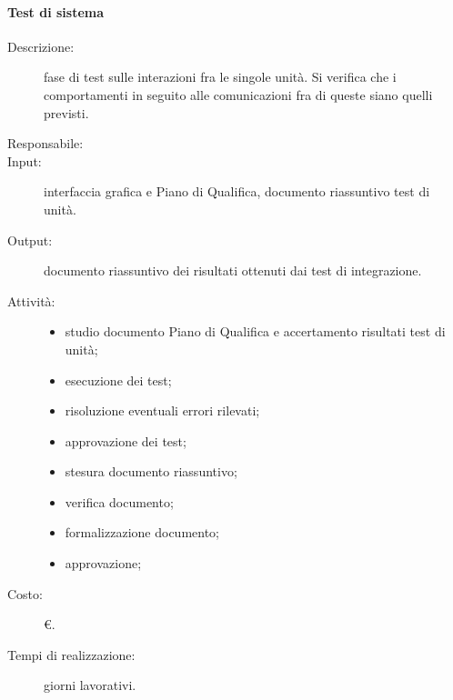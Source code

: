 \paragraph{Test di sistema}
\begin{description}
\item[Descrizione:] fase di test sulle interazioni fra le singole unità. Si verifica che i comportamenti in seguito alle comunicazioni fra di queste siano quelli previsti.
\item[Responsabile:] 
\item[Input:] interfaccia grafica e Piano di Qualifica, documento riassuntivo test di unità.
\item[Output:] documento riassuntivo dei risultati ottenuti dai test di integrazione.
\item[Attività:]
\begin{itemize}
\item studio documento Piano di Qualifica e accertamento risultati test di unità;
\item esecuzione dei test;
\item risoluzione eventuali errori rilevati;
\item approvazione dei test;
\item stesura documento riassuntivo;
\item verifica documento;
\item formalizzazione documento;
\item approvazione;
\end{itemize}
\item[Costo:] \euro{}.
\item[Tempi di realizzazione:]  giorni lavorativi.
\end{description}

